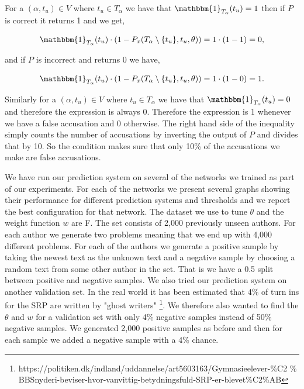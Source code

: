 For a $(\alpha, t_u) \in V$ where $t_u \in T_\alpha$ we have that
$\mathbbm{1}_{T_\alpha}(t_u) = 1$ then if $P$ is correct it returns 1 and we
get,

\begin{equation}
    \mathbbm{1}_{T_\alpha}(t_u) \cdot
    \left(1 - P_x(T_\alpha \setminus \{t_u\}, t_u, \theta)\right) =
    1 \cdot (1 - 1) = 0,
\end{equation}

and if $P$ is incorrect and returns 0 we have,

\begin{equation}
    \mathbbm{1}_{T_\alpha}(t_u) \cdot
    \left(1 - P_x(T_\alpha \setminus \{t_u\}, t_u, \theta)\right) =
    1 \cdot (1 - 0) = 1.
\end{equation}

Similarly for a $(\alpha, t_u) \in V$ where $t_u \in T_\alpha$ we have that
$\mathbbm{1}_{T_\alpha}(t_u) = 0$ and therefore the expression is always
0. Therefore the expression is 1 whenever we have a false accusation and 0
otherwise. The right hand side of the inequality simply counts the number of
accusations by inverting the output of $P$ and divides that by 10. So the
condition makes sure that only 10\% of the accusations we make are false
accusations.

We have run our prediction system on several of the networks we trained as
part of our experiments. For each of the networks we present several graphs
showing their performance for different prediction systems and thresholds and
we report the best configuration for that network. The dataset we use to tune
$\theta$ and the weight function $w$ are \gls{F}. The set consists of 2,000
previously unseen authors. For each author we generate two problems meaning that
we end up with 4,000 different problems. For each of the authors we generate a
positive sample by taking the newest text as the unknown text and a negative
sample by choosing a random text from some other author in the set. That is
we have a 0.5 split between positive and negative samples. We also tried our
prediction system on another validation set. In the real world it has been
estimated that 4\% of turn ins for the \gls{SRP} are written by "ghost writers"
\footnote{https://politiken.dk/indland/uddannelse/art5603163/Gymnasieelever-\%C2
\% BBSnyderi-beviser-hvor-vanvittig-betydningsfuld-SRP-er-blevet\%C2\%AB}. We
therefore also wanted to find the $\theta$ and $w$ for a validation set with
only 4\% negative samples instead of 50\% negative samples. We generated 2,000
positive samples as before and then for each sample we added a negative sample
with a 4\% chance.


